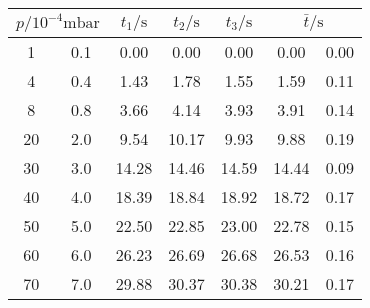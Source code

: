 \label{tab:tabTL3}
	\begin{tabular}{S[table-format=2.0] @{${}\pm{}$} S[table-format=1.1]S[table-format=2.2]S[table-format=2.2]S[table-format=2.2]S[table-format=2.2] @{${}\pm{}$} S[table-format=1.2]}
		\toprule
		 & {$t_1/\si{\second}$} & {$t_2/\si{\second}$} & {$t_3/\si{\second}$} &  \\
		 & 0.1 & 0.00 & 0.00 & 0.00 & 0.00 & 0.00 \\
		 4 & 0.4 & 1.43 & 1.78 & 1.55 & 1.59 & 0.11 \\
		 8 & 0.8 & 3.66 & 4.14 & 3.93 & 3.91 & 0.14 \\
		20 & 2.0 & 9.54 & 10.17 & 9.93 & 9.88 & 0.19 \\
		30 & 3.0 & 14.28 & 14.46 & 14.59 & 14.44 & 0.09 \\
		40 & 4.0 & 18.39 & 18.84 & 18.92 & 18.72 & 0.17 \\
		50 & 5.0 & 22.50 & 22.85 & 23.00 & 22.78 & 0.15 \\
		60 & 6.0 & 26.23 & 26.69 & 26.68 & 26.53 & 0.16 \\
		70 & 7.0 & 29.88 & 30.37 & 30.38 & 30.21 & 0.17 \\
		\bottomrule
	\end{tabular}
